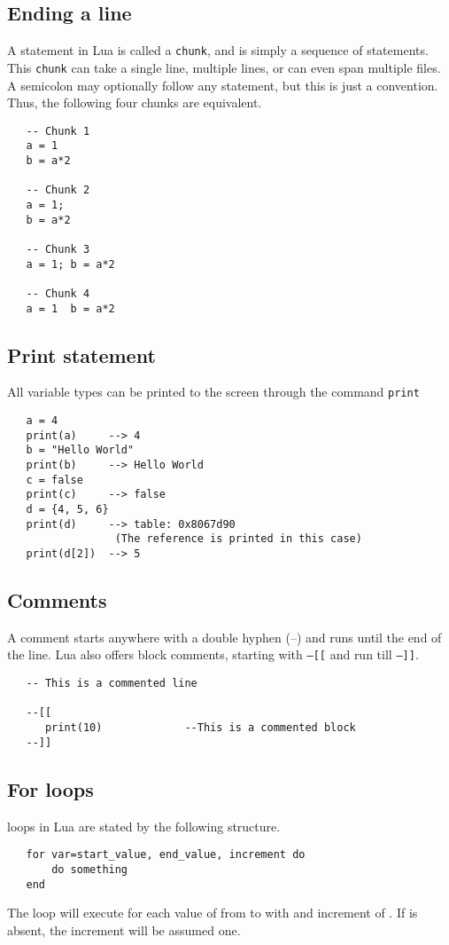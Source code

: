 \subsection{Ending a line}
A statement in Lua is called a {\tt chunk},
and is simply a sequence of statements. 
This {\tt chunk} can take a single line,
multiple lines, or can even span multiple files.
A semicolon may optionally follow any statement,
but this is just a convention. Thus, the following
four chunks are equivalent.
\begin{verbatim}
   -- Chunk 1
   a = 1
   b = a*2

   -- Chunk 2
   a = 1;
   b = a*2

   -- Chunk 3
   a = 1; b = a*2

   -- Chunk 4
   a = 1  b = a*2
\end{verbatim}


\subsection{Print statement}
All variable types can be printed to the screen through
the command {\tt print}
\begin{verbatim}
   a = 4
   print(a)     --> 4
   b = "Hello World"
   print(b)     --> Hello World
   c = false
   print(c)     --> false
   d = {4, 5, 6}
   print(d)     --> table: 0x8067d90
                 (The reference is printed in this case)
   print(d[2])  --> 5
\end{verbatim}


\subsection{Comments}
A comment starts anywhere with a double hyphen (--)
and runs until the end of the line. Lua also offers
block comments, starting with {\tt --[[} and run till
{\tt --]]}.
\begin{verbatim}
   -- This is a commented line

   --[[
      print(10)             --This is a commented block
   --]]
\end{verbatim}

\subsection{For loops}
 loops in Lua are stated by the following 
structure.
\begin{verbatim}
   for var=start_value, end_value, increment do
       do something
   end
\end{verbatim}
The loop will execute  for each value
of  from  to 
with and increment of . If 
is absent, the increment will be assumed one. 

